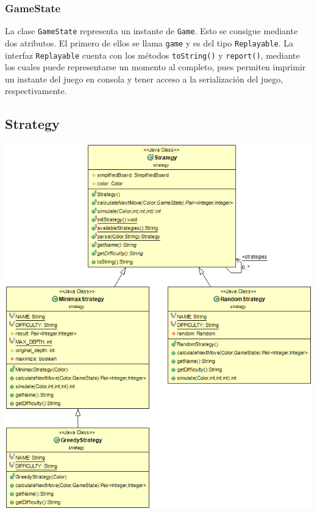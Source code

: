 \documentclass[12pt,a4paper,openright]{book}
\theoremstyle{break}
\begin{document}
\subsubsection{GameState}

La clase \texttt{GameState} representa un instante de \texttt{Game}. Esto se consigue mediante dos atributos. El primero de ellos se llama \texttt{game} y es del tipo \texttt{Replayable}. La interfaz \texttt{Replayable} cuenta con los métodos \texttt{toString()} y \texttt{report()}, mediante los cuales puede representarse un momento al completo, pues permiten imprimir un instante del juego en consola y tener acceso a la serialización del juego, respectivamente.

\subsection{Strategy}

\label{subsec:Strategy}

\begin{center}
\includegraphics[scale=0.75]{Strategy-sprint7.png} 
\end{center}
\end{document}
